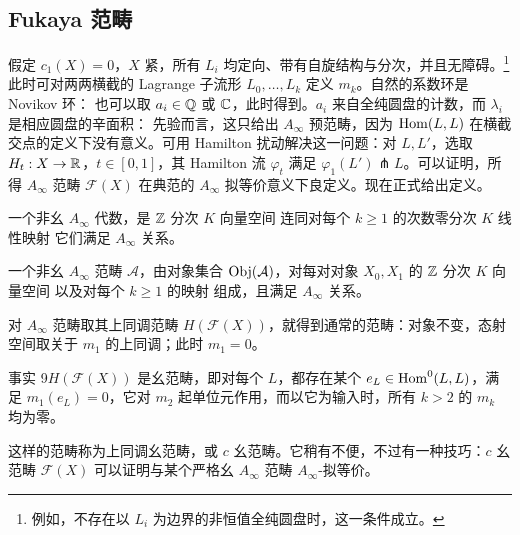 \subsection{Fukaya 范畴}
假定 $c_1(X)=0$，$X$ 紧，所有 $L_i$ 均定向、带有自旋结构与分次，并且无障碍。\footnote{例如，不存在以 $L_i$ 为边界的非恒值全纯圆盘时，这一条件成立。}此时可对两两横截的 Lagrange 子流形 $L_0,\ldots,L_k$ 定义 $m_k$。自然的系数环是 Novikov 环：
也可以取 $a_i\in\mathbb Q$ 或 $\mathbb C$，此时得到。$a_i$ 来自全纯圆盘的计数，而 $\lambda_i$ 是相应圆盘的辛面积：
先验而言，这只给出 $A_\infty$ 预范畴，因为 $\operatorname{Hom}(L,L)$ 在横截交点的定义下没有意义。可用 Hamilton 扰动解决这一问题：对 $L,L'$，选取 $H_t:X\to\mathbb R$，$t\in[0,1]$，其 Hamilton 流 $\varphi_t$ 满足 $\varphi_1(L')\pitchfork L$。可以证明，所得 $A_\infty$ 范畴 $\mathcal F(X)$ 在典范的 $A_\infty$ 拟等价意义下良定义。现在正式给出定义。
\begin{definition}\label{def:6.1}
一个非幺 $A_\infty$ 代数，是 $\mathbb Z$ 分次 $K$ 向量空间
连同对每个 $k\ge1$ 的次数零分次 $K$ 线性映射
它们满足 $A_\infty$ 关系。
\end{definition}
\begin{definition}\label{def:6.2}
一个非幺 $A_\infty$ 范畴 $\mathcal A$，由对象集合 $\operatorname{Obj}(\mathcal A)$，对每对对象 $X_0,X_1$ 的 $\mathbb Z$ 分次 $K$ 向量空间
以及对每个 $k\ge1$ 的映射
组成，且满足 $A_\infty$ 关系。
\end{definition}
对 $A_\infty$ 范畴取其上同调范畴 $H(\mathcal F(X))$，就得到通常的范畴：对象不变，态射空间取关于 $m_1$ 的上同调；此时 $m_1=0$。
\begin{custom}{事实 9}\hypertarget{fact:9}{}$H(\mathcal F(X))$ 是幺范畴，即对每个 $L$，都存在某个 $e_L\in\operatorname{Hom}^0(L,L)$，满足 $m_1(e_L)=0$，它对 $m_2$ 起单位元作用，而以它为输入时，所有 $k>2$ 的 $m_k$ 均为零。\end{custom}
这样的范畴称为上同调幺范畴，或 $c$ 幺范畴。它稍有不便，不过有一种技巧：$c$ 幺范畴 $\mathcal F(X)$ 可以证明与某个严格幺 $A_\infty$ 范畴 $A_\infty$-拟等价。
